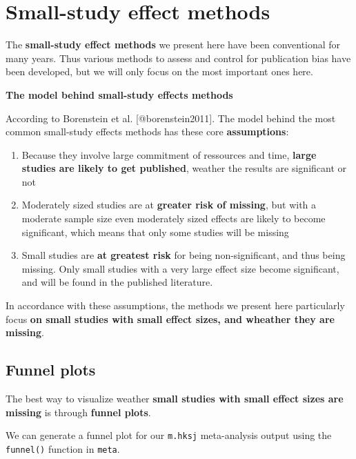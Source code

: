 \documentclass[]{book}
\providecommand{\tightlist}{%
  \setlength{\itemsep}{0pt}\setlength{\parskip}{0pt}}
\theoremstyle{definition}
\theoremstyle{definition}
\theoremstyle{definition}
\theoremstyle{remark}
\begin{document}
\hypertarget{smallstudyeffects}{\section{Small-study effect
methods}\label{smallstudyeffects}}

The \textbf{small-study effect methods} we present here have been
conventional for many years. Thus various methods to assess and control
for publication bias have been developed, but we will only focus on the
most important ones here.

\begin{rmdinfo}
\textbf{The model behind small-study effects methods}

According to Borenstein et al. {[}@borenstein2011{]}. The model behind
the most common small-study effects methods has these core
\textbf{assumptions}:

\begin{enumerate}
\def\labelenumi{\arabic{enumi}.}
\tightlist
\item
  Because they involve large commitment of ressources and time,
  \textbf{large studies are likely to get published}, weather the
  results are significant or not
\item
  Moderately sized studies are at \textbf{greater risk of missing}, but
  with a moderate sample size even moderately sized effects are likely
  to become significant, which means that only some studies will be
  missing
\item
  Small studies are \textbf{at greatest risk} for being non-significant,
  and thus being missing. Only small studies with a very large effect
  size become significant, and will be found in the published
  literature.
\end{enumerate}

In accordance with these assumptions, the methods we present here
particularly focus \textbf{on small studies with small effect sizes, and
wheather they are missing}.
\end{rmdinfo}

\subsection{Funnel plots}\label{funnel-plots}

The best way to visualize weather \textbf{small studies with small
effect sizes are missing} is through \textbf{funnel plots}.

We can generate a funnel plot for our \texttt{m.hksj} meta-analysis
output using the \texttt{funnel()} function in \texttt{meta}.
\end{document}
